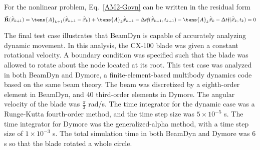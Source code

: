  For the nonlinear problem, Eq.~\eqref{AM2-Govn} can be written in the residual form
\begin{equation}
    \label{AM2-Residual}
    \vec{\textbf{R}}(\hat{\vec{x}}_{k+1}) = \tens{A}_{k+1} (\hat{\vec{x}}_{k+1}-\hat{\vec{x}}_{k})+\tens{A}_k \hat{\vec{x}}_{k+1} - \Delta t \mathfrak{f}(\hat{\vec{x}}_{k+1},t_{k+1}) - \tens{A}_k \hat{\vec{x}}_{k} - \Delta t \mathfrak{f}(\hat{\vec{x}}_{k},t_{k}) =0
\end{equation}

The final test case illustrates that BeamDyn is capable of accurately analyzing dynamic movement. In this analysis, the CX-100 blade was given a constant rotational velocity. A boundary condition was specified such that the blade was allowed to rotate about the node located at its root. This test case was analyzed in both BeamDyn and Dymore, a finite-element-based multibody dynamics code based on the same beam theory. The beam was discretized by a eighth-order element in BeamDyn, and 40 third-order elements in Dymore. The angular velocity of the blade was $\frac{\pi}{3}$ rad/s. The time integrator for the dynamic case was a Runge-Kutta fourth-order method, and the time step size was $5 \times 10^{-5}$ s. The time integrator for Dymore was the generalized-alpha method, with a time step size of $1 \times 10^{-3}$ s. The total simulation time in both BeamDyn and Dymore was 6 s so that the blade rotated a whole circle.

